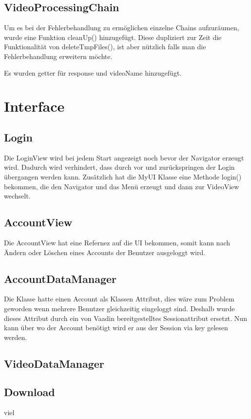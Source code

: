 \subsection{VideoProcessingChain}
Um es bei der Fehlerbehandlung zu ermöglichen einzelne Chains aufzuräumen, wurde eine Funktion cleanUp() hinzugefügt. Diese dupliziert zur Zeit die Funktionalität von deleteTmpFiles(), ist aber nützlich falls man die Fehlerbehandlung erweitern möchte. \par 
Es wurden getter für response und videoName hinzugefügt.

\section{Interface}

\subsection{Login}
Die LoginView wird bei jedem Start angezeigt noch bevor der Navigator erzeugt wird. Dadurch wird verhindert, dass durch vor und zurückspringen der Login übergangen werden kann. Zusätzlich hat die MyUI Klasse eine Methode login() bekommen, die den Navigator und das Menü erzeugt und dann zur VideoView wechselt.

\subsection{AccountView}
Die AccountView hat eine Refernez auf die UI bekommen, somit kann nach Ändern oder Löschen eines Accounts der Benutzer ausgeloggt wird.

\subsection{AccountDataManager}
Die Klasse hatte einen Account als Klassen Attribut, dies wäre zum Problem geworden wenn mehrere Benutzer gleichzeitig eingeloggt sind. Deshalb wurde dieses Attribut durch ein von Vaadin bereitgestelltes Sessionattribut ersetzt. Nun kann über wo der Account benötigt wird er aus der Session via key gelesen werden.

\subsection{VideoDataManager}


\subsection{Download} \label{sec:Download}
viel

